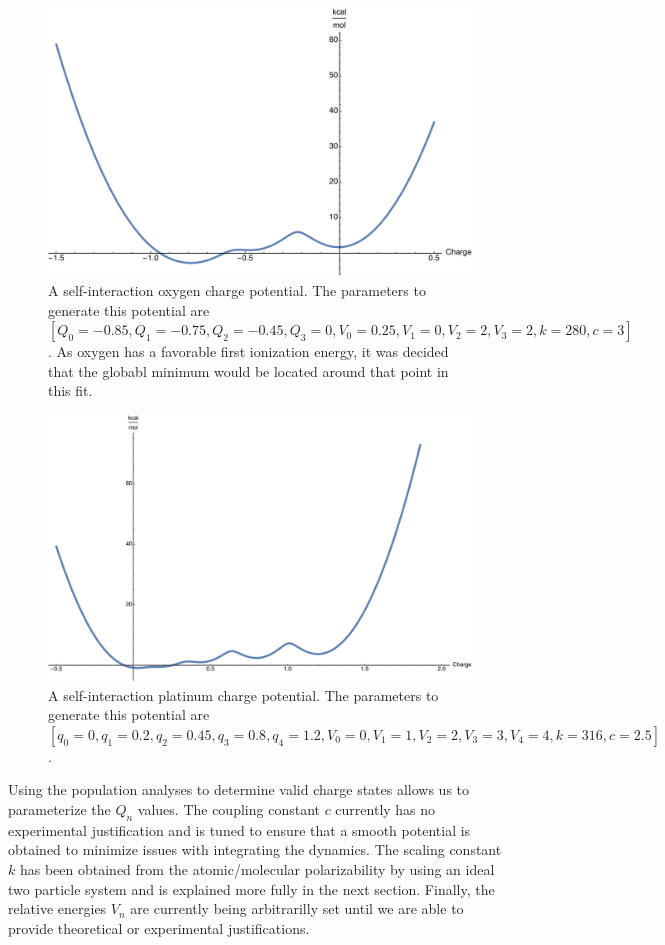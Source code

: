 \begin{figure}
  \centering
  \includegraphics[width=0.75\linewidth]{../figures/chap5/Oxygen_Charge_Testing.pdf}
  \caption{A self-interaction oxygen charge potential. The parameters to
generate this potential are $[Q_0 = -0.85, Q_1 = -0.75, Q_2 = -0.45, Q_3 = 0,
V_0 = 0.25, V_1 = 0, V_2 = 2, V_3 = 2, k = 280, c = 3]$. As oxygen has a
favorable first ionization energy, it was decided that the globabl minimum
would be located around that point in this fit.}
\label{fig:Ocharge}
\end{figure}

\begin{figure}
  \centering
  \includegraphics[width=0.75\linewidth]{../figures/chap5/Pt_Charge_Testing.pdf}
  \caption{A self-interaction platinum charge potential. The parameters to
generate this potential are $[q_0 = 0, q_1 = 0.2, q_2 = 0.45, q_3 = 0.8, q_4 =
1.2, V_0 = 0, V_1 = 1, V_2 = 2, V_3 = 3, V_4 = 4, k = 316, c = 2.5]$.}
\label{fig:PtCharge}
\end{figure}

Using the population analyses to determine valid charge states allows us to
parameterize the $Q_n$ values. The coupling constant $c$ currently has no
experimental justification and is tuned to ensure that a smooth potential is
obtained to minimize issues with integrating the dynamics. The scaling constant
$k$ has been obtained from the atomic/molecular polarizability by using an
ideal two particle system and is explained more fully in the next section.
Finally, the relative energies $V_n$ are currently being arbitrarilly set until
we are able to provide theoretical or experimental justifications.

